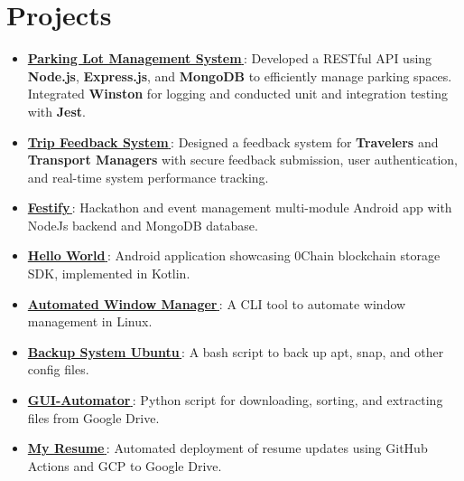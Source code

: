 \documentclass[letterpaper,1pt]{article}
\let\orighref\href
\renewcommand{\href}[2]{\orighref{#1}{#2\,\faExternalLink}}
\begin{document}
\section{Projects}
\begin{itemize}[leftmargin=*, itemsep=1pt, parsep=0pt]

  \item \href{https://github.com/yash10019coder/ParkingLotBackend}{\textbf{Parking Lot Management System}}: Developed a RESTful API using \textbf{Node.js}, \textbf{Express.js}, and \textbf{MongoDB} to efficiently manage parking spaces. Integrated \textbf{Winston} for logging and conducted unit and integration testing with \textbf{Jest}.
  \item \href{https://github.com/yash10019coder/TravelSpringBoot}{\textbf{Trip Feedback System}}: Designed a feedback system for \textbf{Travelers} and \textbf{Transport Managers} with secure feedback submission, user authentication, and real-time system performance tracking.
  \item \href{https://github.com/yash10019coder/festify-android}{\textbf{Festify}}: Hackathon and event management multi-module Android app with NodeJs backend and MongoDB database.
  \item \href{https://github.com/0chain/HelloWorld-Android}{\textbf{Hello World}}: Android application showcasing 0Chain blockchain storage SDK, implemented in Kotlin.
  \item \href{https://github.com/yash10019coder/AutomatedWindowManager}{\textbf{Automated Window Manager}}: A CLI tool to automate window management in Linux.
  \item \href{https://github.com/yash10019coder/backup-system-ubuntu}{\textbf{Backup System Ubuntu}}: A bash script to back up apt, snap, and other config files.
  \item \href{https://github.com/yash10019coder/Gui-Automator}{\textbf{GUI-Automator}}: Python script for downloading, sorting, and extracting files from Google Drive.
  \item \href{https://github.com/yash10019coder/resume}{\textbf{My Resume}}: Automated deployment of resume updates using GitHub Actions and GCP to Google Drive.

\end{itemize}
\end{document}

